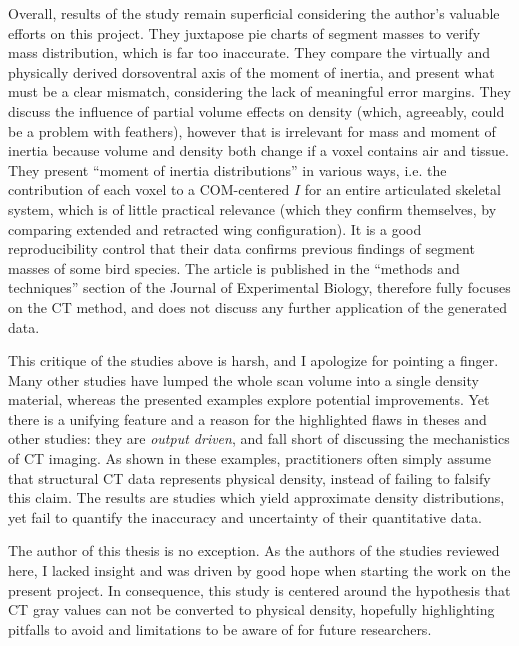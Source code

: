 Overall, results of the \citet{Durston2022} study remain superficial considering the author's valuable efforts on this project.
They juxtapose pie charts of segment masses to verify mass distribution, which is far too inaccurate.
They compare the virtually and physically derived dorsoventral axis of the moment of inertia, and present what must be a clear mismatch, considering the lack of meaningful error margins.
They discuss the influence of partial volume effects on density (which, agreeably, could be a problem with feathers), however that is irrelevant for mass and moment of inertia because volume and density both change if a voxel contains air and tissue.
They present ``moment of inertia distributions'' in various ways, i.e. the contribution of each voxel to a COM-centered \(I\) for an entire articulated skeletal system, which is of little practical relevance (which they confirm themselves, by comparing extended and retracted wing configuration).
It is a good reproducibility control that their data confirms previous findings of segment masses of some bird species.
The article is published in the ``methods and techniques'' section of the Journal of Experimental Biology, therefore fully focuses on the CT method, and does not discuss any further application of the generated data.



This critique of the studies above is harsh, and I apologize for pointing a finger.
Many other studies have lumped the whole scan volume into a single density material, whereas the presented examples explore potential improvements.
Yet there is a unifying feature and a reason for the highlighted flaws in theses and other studies: they are \emph{output driven}, and fall short of discussing the mechanistics of CT imaging.
As shown in these examples, practitioners often simply assume that structural CT data represents physical density, instead of failing to falsify this claim.
The results are studies which yield approximate density distributions, yet fail to quantify the inaccuracy and uncertainty of their quantitative data.


The author of this thesis is no exception.
As the authors of the studies reviewed here, I lacked insight and was driven by good hope when starting the work on the present project.
In consequence, this study is centered around the hypothesis that CT gray values can not be converted to physical density, hopefully highlighting pitfalls to avoid and limitations to be aware of for future researchers.


